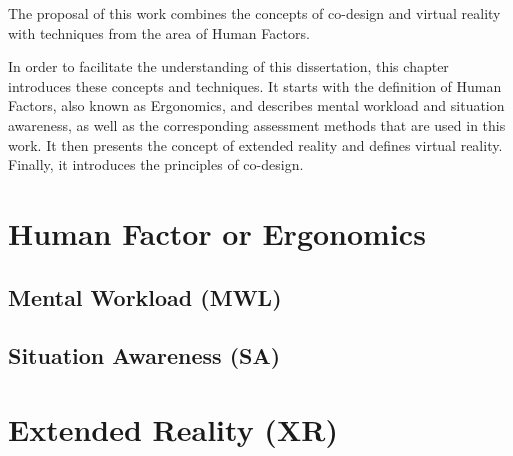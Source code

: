 
The proposal of this work combines the concepts of co-design and virtual reality with techniques from the area of Human Factors. 

In order to facilitate the understanding of this dissertation, this chapter introduces these concepts and techniques. It starts with the definition of Human Factors, also known as Ergonomics, and describes mental workload and situation awareness, as well as the corresponding assessment methods that are used in this work. It then presents the concept of extended reality and defines virtual reality. Finally, it introduces the principles of co-design.

\section{Human Factor or Ergonomics}
\label{sec:human_factors}

    

\subsection{Mental Workload (MWL)}
\label{sec:mental_workload}

    

\subsection{Situation Awareness (SA)}
\label{sec:situation_awareness}

    

\section{Extended Reality (XR)}
\label{sec:extended_reality}

